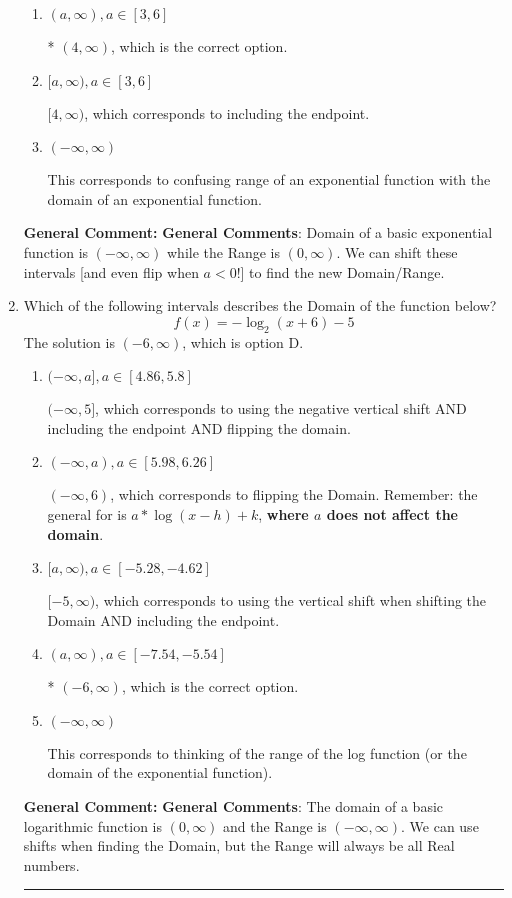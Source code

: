 \documentclass{extbook}[14pt]
\newcommand{\litem}[1]{\item #1

\rule{\textwidth}{0.4pt}}
\begin{document}
\begin{enumerate}
{\begin{enumerate}[label=\Alph*.]
$(-\infty, -4]$, which corresponds to using the negative vertical shift AND flipping the Range interval AND including the endpoint.
\item \( (a, \infty), a \in [3, 6] \)

* $(4, \infty)$, which is the correct option.
\item \( [a, \infty), a \in [3, 6] \)

$[4, \infty)$, which corresponds to including the endpoint.
\item \( (-\infty, \infty) \)

This corresponds to confusing range of an exponential function with the domain of an exponential function.
\end{enumerate}

\textbf{General Comment:} \textbf{General Comments}: Domain of a basic exponential function is $(-\infty, \infty)$ while the Range is $(0, \infty)$. We can shift these intervals [and even flip when $a<0$!] to find the new Domain/Range.
}
\litem{
Which of the following intervals describes the Domain of the function below?
\[ f(x) = -\log_2{(x+6)}-5 \]The solution is \( (-6, \infty) \), which is option D.\begin{enumerate}[label=\Alph*.]
\item \( (-\infty, a], a \in [4.86, 5.8] \)

$(-\infty, 5]$, which corresponds to using the negative vertical shift AND including the endpoint AND flipping the domain.
\item \( (-\infty, a), a \in [5.98, 6.26] \)

$(-\infty, 6)$, which corresponds to flipping the Domain. Remember: the general for is $a*\log(x-h)+k$, \textbf{where $a$ does not affect the domain}.
\item \( [a, \infty), a \in [-5.28, -4.62] \)

$[-5, \infty)$, which corresponds to using the vertical shift when shifting the Domain AND including the endpoint.
\item \( (a, \infty), a \in [-7.54, -5.54] \)

* $(-6, \infty)$, which is the correct option.
\item \( (-\infty, \infty) \)

This corresponds to thinking of the range of the log function (or the domain of the exponential function).
\end{enumerate}

\textbf{General Comment:} \textbf{General Comments}: The domain of a basic logarithmic function is $(0, \infty)$ and the Range is $(-\infty, \infty)$. We can use shifts when finding the Domain, but the Range will always be all Real numbers.
}
\end{enumerate}
\end{document}
